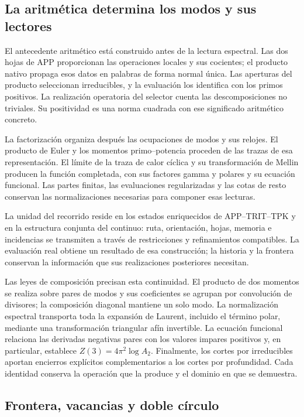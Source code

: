 \subsection*{La aritmética determina los modos y sus lectores}

El antecedente aritmético está construido antes de la lectura
espectral. Las dos hojas de APP proporcionan las operaciones
locales y sus cocientes; el producto nativo propaga esos datos
en palabras de forma normal única. Las aperturas del producto
seleccionan irreducibles, y la evaluación los identifica con
los primos positivos. La realización operatoria del selector
cuenta las descomposiciones no triviales. Su positividad es
una norma cuadrada con ese significado aritmético concreto.

La factorización organiza después las ocupaciones de modos y
sus relojes. El producto de Euler y los momentos
primo--potencia proceden de las trazas de esa representación.
El límite de la traza de calor cíclica y su transformación de
Mellin producen la función completada, con sus factores gamma
y polares y su ecuación funcional. Las partes finitas, las
evaluaciones regularizadas y las cotas de resto conservan
las normalizaciones necesarias para componer esas lecturas.

La unidad del recorrido reside en los estados enriquecidos
de APP--TRIT--TPK y en la estructura conjunta del continuo:
ruta, orientación, hojas, memoria e incidencias se transmiten
a través de restricciones y refinamientos compatibles. La
evaluación real obtiene un resultado de esa construcción;
la historia y la frontera conservan la información que sus
realizaciones posteriores necesitan.

Las leyes de composición precisan esta continuidad. El producto de
dos momentos se realiza sobre pares de modos y sus coeficientes se
agrupan por convolución de divisores; la composición diagonal mantiene
un solo modo. La normalización espectral transporta toda la expansión
de Laurent, incluido el término polar, mediante una transformación
triangular afín invertible. La ecuación funcional relaciona las
derivadas negativas pares con los valores impares positivos y, en
particular, establece $Z(3)=4\pi^2\log A_2$. Finalmente, los cortes
por irreducibles aportan encierros explícitos complementarios a los
cortes por profundidad. Cada identidad conserva la operación que la
produce y el dominio en que se demuestra.

\subsection*{Frontera, vacancias y doble círculo}

